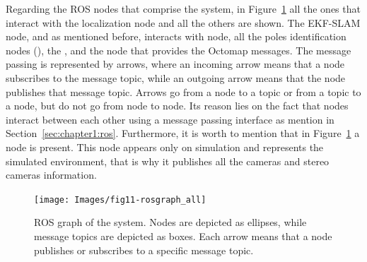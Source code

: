 Regarding the ROS nodes that comprise the system, in Figure~\ref{fig:chapter2:architecture:nodes:all} all the ones that interact with the localization node and all the others are shown. The EKF-SLAM node, and as mentioned before, interacts with  node, all the poles identification nodes (), the , and the  node that provides the Octomap messages. The message passing is represented by arrows, where an incoming arrow means that a node subscribes to the message topic, while an outgoing arrow means that the node publishes that message topic. Arrows go from a node to a topic or from a topic to a node, but do not go from node to node. Its reason lies on the fact that nodes interact between each other using a message passing interface as mention in Section~\ref{sec:chapter1:ros}. Furthermore, it is worth to mention that in Figure~\ref{fig:chapter2:architecture:nodes:all} a  node is present. This node appears only on simulation and represents the simulated environment, that is why it publishes all the cameras and stereo cameras information.\\
\begin{figure}
    \centering
    \texttt{[image: Images/fig11-rosgraph\_all]}
    \caption[ROS graph of the system]{ROS graph of the system. Nodes are depicted as ellipses, while message topics are depicted as boxes. Each arrow means that a node publishes or subscribes to a specific message topic.}
    \label{fig:chapter2:architecture:nodes:all}
\end{figure}





















